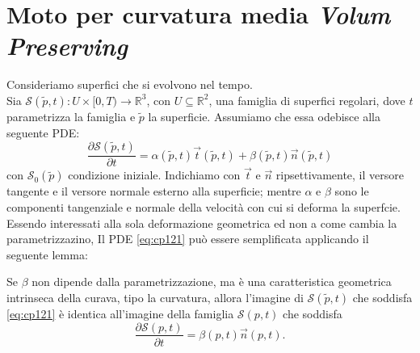 \section{Moto per curvatura media \emph{Volum Preserving}}

Consideriamo superfici che si evolvono nel tempo. \\
Sia $\mathcal{S}(\tilde{p},t):U\times[0,T)\longrightarrow\mathbb{R}^3$, con $U\subseteq\mathbb{R}^2$, una famiglia di superfici regolari, dove $t$ parametrizza la famiglia e $\tilde{p}$ la superficie. Assumiamo che essa odebisce alla seguente PDE:
\begin{equation}
  \label{eq:cp121}
  \frac{\partial\mathcal{S}(\tilde{p},t)}{\partial t} = \alpha(\tilde{p},t)\vec{t}(\tilde{p},t) + \beta(\tilde{p},t)\vec{n}(\tilde{p},t)
\end{equation}
con $\mathcal{S}_0(\tilde{p})$ condizione iniziale. Indichiamo con $\vec{t}$ e $\vec{n}$ ripsettivamente, il versore tangente e il versore normale esterno alla superficie; mentre $\alpha$ e $\beta$ sono le componenti tangenziale e normale della velocità con cui si deforma la superfcie. Essendo interessati alla sola deformazione geometrica ed non a come cambia la parametrizzazino, Il PDE \eqref{eq:cp121} può essere semplificata applicando il seguente lemma:
\begin{lemma}
Se $\beta$ non dipende dalla parametrizzazione, ma è una caratteristica geometrica intrinseca della curava, tipo la curvatura, allora l'imagine di $\mathcal{S}(\tilde{p},t)$ che soddisfa \eqref{eq:cp121} è identica all'imagine della famiglia $\mathcal{S}(p,t)$ che soddisfa
\begin{equation}
  \label{eq:cp122}
  \frac{\partial\mathcal{S}(p,t)}{\partial t} =\beta(p,t)\vec{n}(p,t).
\end{equation}
\end{lemma}

